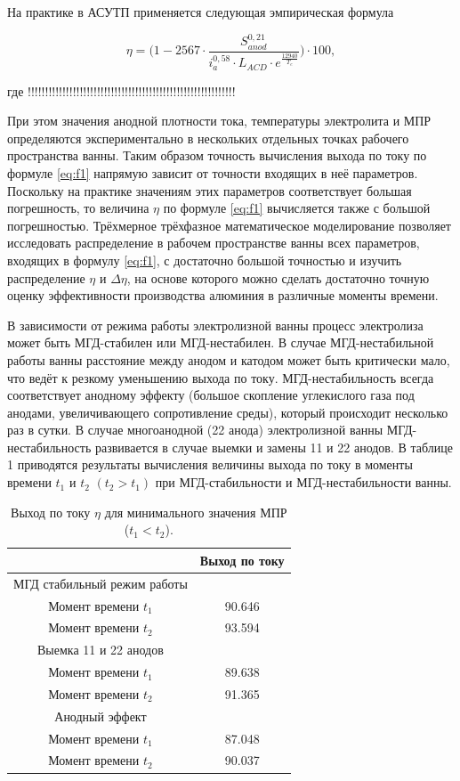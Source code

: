 \documentclass{article}
\begin{document}
На практике в АСУТП применяется следующая эмпирическая формула \cite{litlink:derkach2}

\begin{equation}\label{eq:f1}
\eta = \bigg(1-2567 \cdot \frac{S^{0,21}_{anod}}{i^{0,58}_{a}\cdot L_{ACD} \cdot e^{\frac{12940}{T_e}}}\bigg) \cdot 100,
\end{equation}

где !!!!!!!!!!!!!!!!!!!!!!!!!!!!!!!!!!!!!!!!!!!!!!!!!!!!!!!!!!!!

При этом значения анодной плотности тока, температуры электролита и МПР определяются экспериментально в нескольких отдельных точках рабочего пространства ванны.
Таким образом точность вычисления выхода по току по формуле \ref{eq:f1} напрямую зависит от точности входящих в неё параметров. Поскольку на практике значениям этих параметров соответствует большая погрешность, то величина $\eta$ по формуле \ref{eq:f1} вычисляется также с большой погрешностью. Трёхмерное трёхфазное математическое моделирование \cite{litlink:kalmykov} позволяет исследовать распределение в рабочем пространстве ванны всех параметров, входящих в формулу \ref{eq:f1}, с достаточно большой точностью и изучить распределение $\eta$ и $\Delta\eta$, на основе которого можно сделать достаточно точную оценку эффективности производства алюминия в различные моменты времени.

В зависимости от режима работы электролизной ванны процесс электролиза может быть МГД-стабилен или МГД-нестабилен. В случае МГД-нестабильной работы ванны расстояние между анодом и катодом может быть критически мало, что ведёт к резкому уменьшению выхода по току. МГД-нестабильность всегда соответствует анодному эффекту (большое скопление углекислого газа под анодами, увеличивающего сопротивление среды), который происходит несколько раз в сутки. В случае многоанодной (22 анода) электролизной ванны МГД-нестабильность развивается в случае выемки и замены 11 и 22 анодов. В таблице 1 приводятся результаты вычисления величины выхода по току в моменты времени $t_1$ и $t_2$ $(t_2>t_1)$ при МГД-стабильности и МГД-нестабильности ванны. 

\begin{table}[H]
\centering
\begin{tabular}{|c|c|}
\hline
			&Выход по току	\\
\hline
МГД стабильный режим работы &	\\
Момент времени $t_1$			&90.646	\\ 
Момент времени $t_2$		&93.594	\\  
\hline
Выемка 11 и 22 анодов &	\\
Момент времени $t_1$		&89.638	\\  
Момент времени $t_2$		&91.365	\\  
\hline
Анодный эффект &	\\
Момент времени $t_1$	&87.048	\\  
Момент времени $t_2$	&90.037	\\  
\hline
\end{tabular}
\caption{Выход по току $\eta$ для минимального значения МПР ($t_1 < t_2$). \label{table:vihPoToku}}
\end{table}
\end{document}
